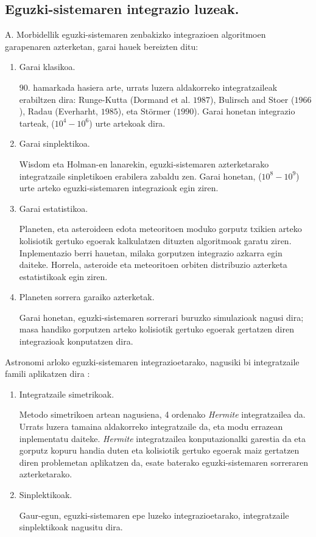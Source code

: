 \subsection*{Eguzki-sistemaren integrazio luzeak.} 


A. Morbidellik \cite{Morbidelli2002} eguzki-sistemaren zenbakizko integrazioen algoritmoen garapenaren azterketan, garai hauek bereizten ditu:
\begin{enumerate}

\item Garai klasikoa.

$90$. hamarkada hasiera arte, urrats luzera aldakorreko integratzaileak erabiltzen dira: Runge-Kutta (Dormand et al. $1987$), Bulirsch and Stoer ($1966$), Radau (Everharht, $1985$), eta Störmer ($1990$). Garai honetan integrazio tarteak, ($10^4-10^6$) urte artekoak dira.  

\item Garai sinplektikoa.

Wisdom eta Holman-en \cite[1991]{Sussman1992} lanarekin, eguzki-sistemaren azterketarako integratzaile sinpletikoen erabilera zabaldu zen. Garai honetan, ($10^8-10^9$) urte arteko eguzki-sistemaren integrazioak egin ziren.  

\item Garai estatistikoa.

Planeten, eta asteroideen edota meteoritoen moduko gorputz txikien  arteko kolisiotik gertuko egoerak kalkulatzen dituzten algoritmoak garatu ziren. Inplementazio berri hauetan, milaka gorputzen integrazio azkarra egin daiteke. Horrela, asteroide eta meteoritoen orbiten distribuzio azterketa estatistikoak egin ziren.

\item Planeten sorrera garaiko azterketak.

Garai honetan, eguzki-sistemaren sorrerari buruzko simulazioak nagusi dira; masa handiko gorputzen arteko kolisiotik gertuko egoerak gertatzen diren integrazioak konputatzen dira. 
 
\end{enumerate}

Astronomi arloko eguzki-sistemaren integrazioetarako, nagusiki bi integratzaile famili aplikatzen dira \cite{Ito2007}: 
\begin{enumerate}
\item Integratzaile simetrikoak.

Metodo simetrikoen artean nagusiena, 4 ordenako \emph{Hermite} \cite{Aarseth2008} integratzailea da.
Urrats luzera tamaina aldakorreko integratzaile da, eta modu errazean inplementatu daiteke.  \emph{Hermite} integratzailea konputazionalki garestia da eta gorputz kopuru handia duten eta kolisiotik gertuko egoerak maiz gertatzen diren problemetan aplikatzen da, esate baterako eguzki-sistemaren sorreraren azterketarako.  

\item Sinplektikoak.

Gaur-egun, eguzki-sistemaren epe luzeko integrazioetarako, integratzaile sinplektikoak nagusitu dira. 

\end{enumerate}


